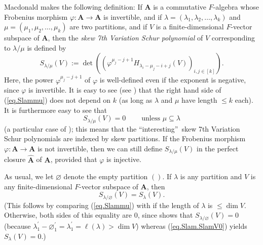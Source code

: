 \documentclass[numbers=enddot,12pt,final,onecolumn,notitlepage]{scrartcl}%
\numberwithin{exer}{section}
\theoremstyle{definition}
\theoremstyle{plainsl}
\begin{document}
Macdonald makes the following definition: If $\mathbf{A}$ is a commutative
$F$-algebra whose Frobenius morphism $\varphi:\mathbf{A}\rightarrow\mathbf{A}$
is invertible, and if $\lambda=\left(  \lambda_{1},\lambda_{2},\ldots
,\lambda_{k}\right)  $ and $\mu=\left(  \mu_{1},\mu_{2},\ldots,\mu_{k}\right)
$ are two partitions, and if $V$ is a finite-dimensional $F$-vector subspace
of $\mathbf{A}$, then the \emph{skew 7th Variation Schur polynomial} of $V$
corresponding to $\lambda/\mu$ is defined by%
\begin{equation}
S_{\lambda/\mu}\left(  V\right)  :=\det\left(  \left(  \varphi^{\mu_{j}%
-j+1}H_{\lambda_{i}-\mu_{j}-i+j}\left(  V\right)  \right)  _{i,j\in\left[
k\right]  }\right)  . \label{eq.Slammu}%
\end{equation}
Here, the power $\varphi^{\mu_{j}-j+1}$ of $\varphi$ is well-defined even if
the exponent is negative, since $\varphi$ is invertible. It is easy to see
(see \cite[errata, \textquotedblleft page 26, (7.11)\textquotedblright%
]{Macdon92}) that the right hand side of (\ref{eq.Slammu}) does not depend on
$k$ (as long as $\lambda$ and $\mu$ have length $\leq k$ each). It is
furthermore easy to see that%
\begin{equation}
S_{\lambda/\mu}\left(  V\right)  =0\ \ \ \ \ \ \ \ \ \ \text{unless }%
\mu\subseteq\lambda\label{eq.Slammu=0ifnotsub}%
\end{equation}
(a particular case of \cite[(7.12)]{Macdon92}); this means that the
\textquotedblleft interesting\textquotedblright\ skew 7th Variation Schur
polynomials are indexed by skew partitions. If the Frobenius morphism
$\varphi:\mathbf{A}\rightarrow\mathbf{A}$ is not invertible, then we can still
define $S_{\lambda/\mu}\left(  V\right)  $ in the perfect closure
$\widehat{\mathbf{A}}$ of $\mathbf{A}$, provided that $\varphi$ is injective.

As usual, we let $\varnothing$ denote the empty partition $\left(  {}\right)
$. If $\lambda$ is any partition and $V$ is any finite-dimensional $F$-vector
subspace of $\mathbf{A}$, then%
\begin{equation}
S_{\lambda/\varnothing}\left(  V\right)  =S_{\lambda}\left(  V\right)  .
\label{eq.Slam0}%
\end{equation}
(This follows by comparing (\ref{eq.Slammu}) with \cite[(7.10)]{Macdon92} if
the length of $\lambda$ is $\leq\dim V$. Otherwise, both sides of this
equality are $0$, since \cite[(7.12)]{Macdon92} shows that $S_{\lambda
/\varnothing}\left(  V\right)  =0$ (because $\lambda_{1}^{\prime}%
-\varnothing_{1}^{\prime}=\lambda_{1}^{\prime}=\ell\left(  \lambda\right)
>\dim V$) whereas (\ref{eq.Slam.SlamV0}) yields $S_{\lambda}\left(  V\right)
=0$.)
\end{document}
